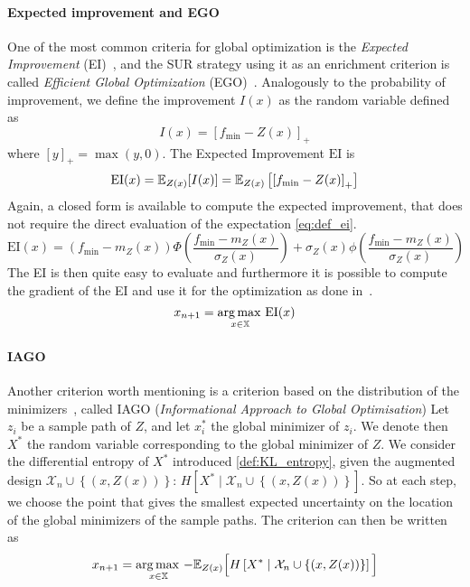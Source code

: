 \documentclass[../../Main_ManuscritThese.tex]{subfiles}
\begin{document}
\paragraph{Expected improvement and EGO}
One of the most common criteria for global optimization is the
\emph{Expected Improvement} (EI)~\cite{mockus_bayesian_1974}, and the
SUR strategy using it as an enrichment criterion is called
\emph{Efficient Global Optimization}
(EGO)~\cite{jones_efficient_1998}.  Analogously to the probability of
improvement, we define the improvement $I(x)$ as the random variable
defined as
\begin{equation}
  \label{eq:def_improvement}
  I(x) = {\left[f_{\min} - Z(x)\right]}_+
\end{equation}
where $[y]_+ = \max(y, 0)$.
The Expected Improvement $\mathrm{EI}$ is 
\begin{align}
  \label{eq:def_ei}
  \mathrm{EI}(x) = \mathbb{E}_{Z(x)}[I(x)]  = \mathbb{E}_{Z(x)}\left[\left[f_{\min} - Z(x) \right]_+\right]
\end{align}
Again, a closed form is available to compute the expected improvement,
that does not require the direct evaluation of the expectation
\cref{eq:def_ei}.
\begin{equation}
  \mathrm{EI}(x) = \left(f_{\min} - m_Z(x)\right) \Phi\left(\frac{f_{\min} - m_Z(x)}{\sigma_Z(x)}\right) + \sigma_Z(x) \phi\left(\frac{f_{\min} - m_Z(x)}{\sigma_Z(x)}\right)
\end{equation}
The EI is then quite easy to evaluate and furthermore it is possible
to compute the gradient of the EI and use it for the optimization as
done in~\cite{pardalos_differentiating_2015}.
\begin{equation}
  x_{n+1} = \operatorname*{arg\,max \,}_{x\in \mathbb{X}} \mathrm{EI}(x)
\end{equation}

\paragraph{IAGO}
\label{ssec:IAGO}
Another criterion worth mentioning is a criterion based on the
distribution of the
minimizers~\cite{villemonteix_informational_2006,hennig_entropy_2011},
called IAGO (\emph{Informational Approach to Global Optimisation}) Let
$z_i$ be a sample path of $Z$, and let $x_i^*$ the global minimizer of
$z_i$.  We denote then $X^*$ the random variable corresponding to the
global minimizer of $Z$.  We consider the differential entropy of
$X^*$ introduced \cref{def:KL_entropy}, given the augmented design
$\mathcal{X}_n \cup \left\{\left(x,Z(x)\right)\right\}$:
$H[X^*\mid \mathcal{X}_n \cup \left\{(x, Z(x))\right\}]$.  So at each
step, we choose the point that gives the smallest expected uncertainty
on the location of the global minimizers of the sample paths.  The
criterion can then be written as
\begin{equation}
  x_{n+1}= \operatorname*{arg\,max \,}_{x \in \mathbb{X}} -\mathbb{E}_{Z(x)}\Big[H\left[X^* \mid \mathcal{X}_n \cup \left\{(x, Z(x))\right\} \right]\Big]
\end{equation}
\end{document}
